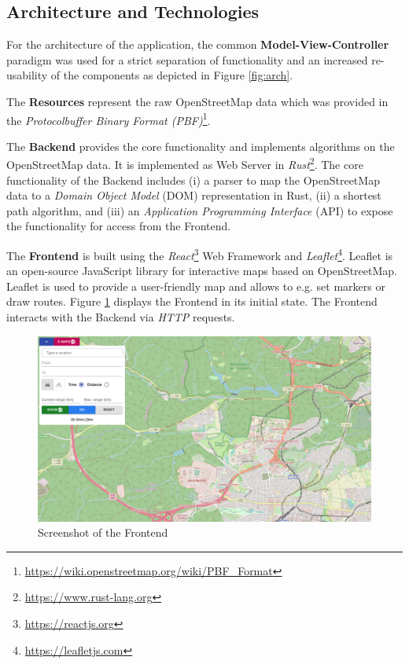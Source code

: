 \documentclass[a4paper]{article}
\begin{document}
\subsection{Architecture and Technologies}
For the architecture of the application, the common \textbf{Model-View-Controller} paradigm was used for a strict separation of functionality and an increased re-usability of the components as depicted in Figure \ref{fig:arch}.\par\medskip
The \textbf{Resources} represent the raw OpenStreetMap data which was provided in the \textit{Protocolbuffer Binary Format (PBF)}\footnote{\url{https://wiki.openstreetmap.org/wiki/PBF_Format}}.\par\medskip
The \textbf{Backend} provides the core functionality and implements algorithms on the OpenStreetMap data.
It is implemented as Web Server in \textit{Rust}\footnote{\url{https://www.rust-lang.org}}.
The core functionality of the Backend includes (i) a parser to map the OpenStreetMap data to a \textit{Domain Object Model} (DOM) representation in Rust,
(ii) a shortest path algorithm, and (iii) an \textit{Application Programming Interface} (API) to expose the functionality for access from the Frontend.\par\medskip
The \textbf{Frontend} is built using the \textit{React}\footnote{\url{https://reactjs.org}} Web Framework and \textit{Leaflet}\footnote{\url{https://leafletjs.com}}. Leaflet is an open-source JavaScript library for interactive maps based on OpenStreetMap.
Leaflet is used to provide a user-friendly map and allows to e.g. set markers or draw routes.
Figure \ref{fig:base_ui} displays the Frontend in its initial state.
The Frontend interacts with the Backend via \textit{HTTP} requests.
\begin{figure}[h]
    \centering
    \includegraphics[scale=0.27]{figures/base_ui}
    \caption{Screenshot of the Frontend}
    \label{fig:base_ui}
\end{figure}
\end{document}
